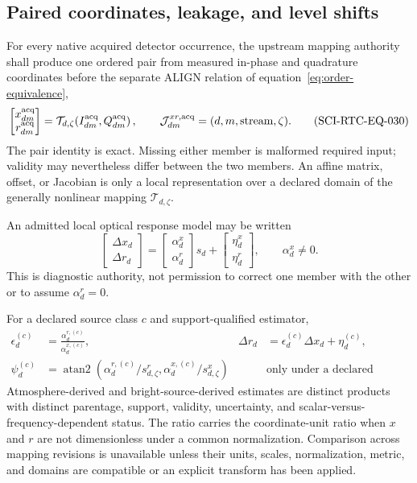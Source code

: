 \subsection{Paired coordinates, leakage, and level shifts}

For every native acquired detector occurrence, the upstream mapping authority
shall produce one ordered pair from measured in-phase and quadrature
coordinates before the separate ALIGN relation of
equation~\eqref{eq:order-equivalence},
\begin{equation}
 \begin{bmatrix}x^{\rm acq}_{dm}\\ r^{\rm acq}_{dm}\end{bmatrix}
 =\mathcal T_{d,\zeta}\!\left(I^{\rm acq}_{dm},Q^{\rm acq}_{dm}\right),
 \qquad
 \mathcal J^{xr,\rm acq}_{dm}=(d,m,\text{stream},\zeta).
 \tag{SCI-RTC-EQ-030}\label{eq:iq-xr-mapping}
\end{equation}
The pair identity is exact.  Missing either member is malformed required
input; validity may nevertheless differ between the two members.  An affine
matrix, offset, or Jacobian is only a local representation over a declared
domain of the generally nonlinear mapping $\mathcal T_{d,\zeta}$.

An admitted local optical response model may be written
\begin{equation}
 \begin{bmatrix}\Delta x_d\\ \Delta r_d\end{bmatrix}
 =\begin{bmatrix}\alpha^x_d\\ \alpha^r_d\end{bmatrix}s_d
 +\begin{bmatrix}\eta^x_d\\ \eta^r_d\end{bmatrix},
 \qquad \alpha^x_d\ne0 .
 \tag{SCI-RTC-EQ-031}\label{eq:optical-response}
\end{equation}
This is diagnostic authority, not permission to correct one member with the
other or to assume $\alpha^r_d=0$.

For a declared source class $c$ and support-qualified estimator,
\begin{equation}
 \begin{aligned}
 \epsilon^{(c)}_d&=\frac{\alpha^{r,(c)}_d}{\alpha^{x,(c)}_d},
 &\Delta r_d&=\epsilon^{(c)}_d\Delta x_d+\eta^{(c)}_d,\\
 \psi^{(c)}_d&=\operatorname{atan2}\!\left(
   \alpha^{r,(c)}_d/s^r_{d,\zeta},
   \alpha^{x,(c)}_d/s^x_{d,\zeta}\right)
 &&\text{only under a declared commensurate metric.}
 \end{aligned}
 \tag{SCI-RTC-EQ-032}\label{eq:leakage}
\end{equation}
Atmosphere-derived and bright-source-derived estimates are distinct products
with distinct parentage, support, validity, uncertainty, and scalar-versus-
frequency-dependent status.  The ratio carries the coordinate-unit ratio when
$x$ and $r$ are not dimensionless under a common normalization.  Comparison
across mapping revisions is unavailable unless their units, scales,
normalization, metric, and domains are compatible or an explicit transform has
been applied.

